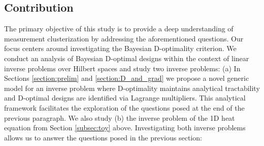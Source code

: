 \subsection{Contribution}
The primary objective of this study is to provide a deep understanding
of measurement clusterization by addressing the aforementioned
questions. Our focus centers around investigating the Bayesian
D-optimality criterion. We conduct an analysis of Bayesian D-optimal
designs within the context of linear inverse problems over Hilbert
spaces and study two inverse problems: (a) In Sections
\ref{section:prelim} and \ref{section:D_and_grad} we propose a novel
generic model for an inverse problem where D-optimality maintains
analytical tractability and D-optimal designs are identified via
Lagrange multipliers. This analytical framework facilitates the
exploration of the questions posed at the end of the previous
paragraph. We also study (b) the inverse problem of the 1D heat
equation from Section \ref{subsec:toy} above. Investigating both
inverse problems allows us to answer the questions posed in the
previous section:

